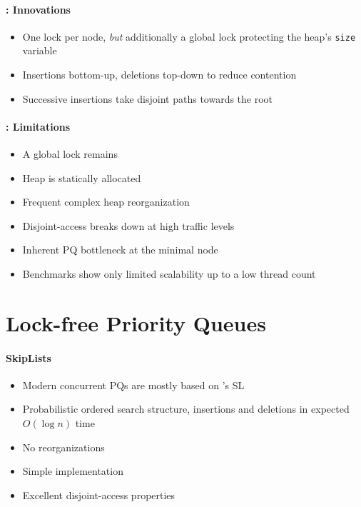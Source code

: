 \documentclass[usenames,dvipsnames]{beamer}
\begin{document}
\begin{frame}{}
\framesubtitle{\citeauthor{hunt1996efficient}: Innovations}

\begin{itemize}
\item One lock per node, \emph{but} additionally a global lock protecting the heap's
      \lstinline|size| variable
\item Insertions bottom-up, deletions top-down to reduce contention
\item Successive insertions take disjoint paths towards the root
\end{itemize}
\end{frame}

\begin{frame}{}
\framesubtitle{\citeauthor{hunt1996efficient}: Limitations}

\begin{itemize}
\item A global lock remains
\item Heap is statically allocated
\item Frequent complex heap reorganization
\item Disjoint-access breaks down at high traffic levels
\item Inherent \ac{PQ} bottleneck at the minimal node
\item Benchmarks show only limited scalability up to a low thread count
\end{itemize}
\end{frame}

\section{Lock-free Priority Queues} \label{sec:lockfree}

\begin{frame}{}
\framesubtitle{SkipLists}

\begin{itemize}
\item Modern concurrent \acp{PQ} are mostly based on \citeauthor{pugh1990skip}'s \ac{SL}
\item Probabilistic ordered search structure, insertions and deletions in expected $O(\log n)$ time
\item No reorganizations
\item Simple implementation
\item Excellent disjoint-access properties
\end{itemize}
\end{frame}
\end{document}
